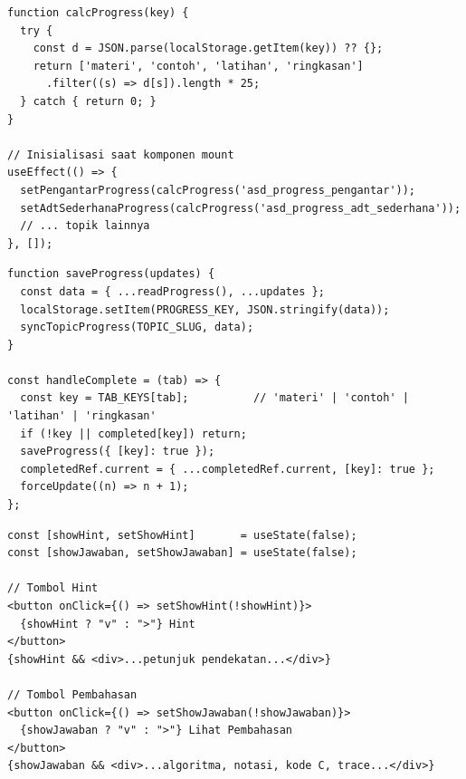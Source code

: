 \begin{lstlisting}[style=javascriptstyle, caption={Perhitungan Progres Topik dari \texttt{localStorage}}, label={lst:topik-progress}]
function calcProgress(key) {
  try {
    const d = JSON.parse(localStorage.getItem(key)) ?? {};
    return ['materi', 'contoh', 'latihan', 'ringkasan']
      .filter((s) => d[s]).length * 25;
  } catch { return 0; }
}

// Inisialisasi saat komponen mount
useEffect(() => {
  setPengantarProgress(calcProgress('asd_progress_pengantar'));
  setAdtSederhanaProgress(calcProgress('asd_progress_adt_sederhana'));
  // ... topik lainnya
}, []);
\end{lstlisting}

\begin{lstlisting}[style=javascriptstyle, caption={Fungsi Penyimpanan Progres Sesi ke \texttt{localStorage} dan \textit{Backend}}, label={lst:materi-progress}]
function saveProgress(updates) {
  const data = { ...readProgress(), ...updates };
  localStorage.setItem(PROGRESS_KEY, JSON.stringify(data));
  syncTopicProgress(TOPIC_SLUG, data);
}

const handleComplete = (tab) => {
  const key = TAB_KEYS[tab];          // 'materi' | 'contoh' | 'latihan' | 'ringkasan'
  if (!key || completed[key]) return;
  saveProgress({ [key]: true });
  completedRef.current = { ...completedRef.current, [key]: true };
  forceUpdate((n) => n + 1);
};
\end{lstlisting}

\begin{lstlisting}[style=javascriptstyle, caption={Mekanisme \textit{Toggle} Hint dan Pembahasan pada Halaman Contoh}, label={lst:contoh-toggle}]
const [showHint, setShowHint]       = useState(false);
const [showJawaban, setShowJawaban] = useState(false);

// Tombol Hint
<button onClick={() => setShowHint(!showHint)}>
  {showHint ? "v" : ">"} Hint
</button>
{showHint && <div>...petunjuk pendekatan...</div>}

// Tombol Pembahasan
<button onClick={() => setShowJawaban(!showJawaban)}>
  {showJawaban ? "v" : ">"} Lihat Pembahasan
</button>
{showJawaban && <div>...algoritma, notasi, kode C, trace...</div>}
\end{lstlisting}

